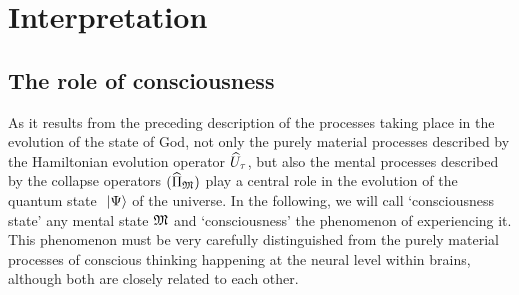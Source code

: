 \chapter{Interpretation}
\label{Interpretation}

\section{The role of consciousness}

As it results from the preceding description of the processes taking place in the evolution of the state of God, not only the purely material processes described by the Hamiltonian evolution operator $\widehat{U}_\tau$, but also the mental processes described by the collapse operators $(\widehat{\Pi}_{\mathfrak{M}})$ play a central role in the evolution of the quantum state $\ \left|{\Psi}\right\rangle$ of the universe.
In the following, we will call `consciousness state' any mental state $\mathfrak{M}$ and `consciousness' the phenomenon of experiencing it.
This phenomenon must be very carefully distinguished from the purely material processes of conscious thinking happening at the neural level within brains, although both are closely related to each other.

